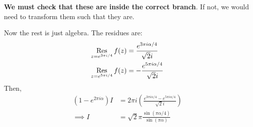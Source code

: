 \documentclass[../Main.tex]{subfiles}
\begin{document}
\begin{example}
    \textbf{We must check that these are inside the correct branch}. If not, we would need to transform them such that they are.

    Now the rest is just algebra. The residues are:
    \begin{align*}
        \operatorname*{Res}_{z = e^{3 \pi i / 4}} f(z) &= \frac{e^{3 \pi i \alpha / 4}}{\sqrt2 i} \\
        \operatorname*{Res}_{z = e^{5 \pi i / 4}} f(z) &= -\frac{e^{5 \pi i \alpha / 4}}{\sqrt2 i}
    \end{align*}
    Then,
    \begin{align*}
        (1 - e^{2\pi i \alpha}) I &= 2\pi i \left(\frac{e^{3 \pi i \alpha / 4} - e^{5 \pi i \alpha / 4}}{\sqrt2i}\right) \\
        \implies I &= \sqrt2\pi \frac{\sin(\pi \alpha / 4)}{\sin(\pi \alpha)}
    \end{align*}
\end{example}
\end{document}
